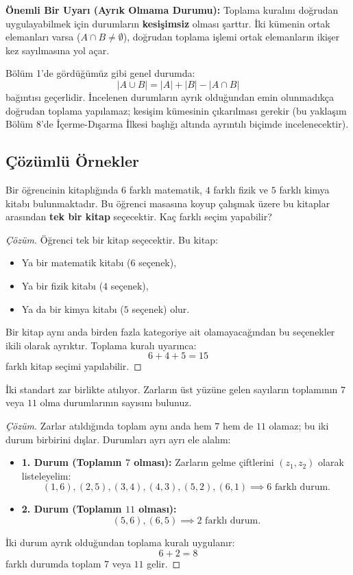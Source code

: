 \textbf{Önemli Bir Uyarı (Ayrık Olmama Durumu):} Toplama kuralını doğrudan uygulayabilmek için durumların \textbf{kesişimsiz} olması şarttır. İki kümenin ortak elemanları varsa ($A \cap B \neq \emptyset$), doğrudan toplama işlemi ortak elemanların ikişer kez sayılmasına yol açar. 

Bölüm 1'de gördüğümüz gibi genel durumda:
\[ |A \cup B| = |A| + |B| - |A \cap B| \]
bağıntısı geçerlidir. İncelenen durumların ayrık olduğundan emin olunmadıkça doğrudan toplama yapılamaz; kesişim kümesinin çıkarılması gerekir (bu yaklaşım Bölüm 8'de İçerme-Dışarma İlkesi başlığı altında ayrıntılı biçimde incelenecektir).

\subsection{Çözümlü Örnekler}

\begin{example}
Bir öğrencinin kitaplığında $6$ farklı matematik, $4$ farklı fizik ve $5$ farklı kimya kitabı bulunmaktadır. Bu öğrenci masasına koyup çalışmak üzere bu kitaplar arasından \textbf{tek bir kitap} seçecektir. Kaç farklı seçim yapabilir?
\end{example}
\begin{proof}[Çözüm]
Öğrenci tek bir kitap seçecektir. Bu kitap:
\begin{itemize}
  \item Ya bir matematik kitabı ($6$ seçenek),
  \item Ya bir fizik kitabı ($4$ seçenek),
  \item Ya da bir kimya kitabı ($5$ seçenek) olur.
\end{itemize}
Bir kitap aynı anda birden fazla kategoriye ait olamayacağından bu seçenekler ikili olarak ayrıktır. Toplama kuralı uyarınca:
\[ 6 + 4 + 5 = 15 \]
farklı kitap seçimi yapılabilir.
\end{proof}

\begin{example}
İki standart zar birlikte atılıyor. Zarların üst yüzüne gelen sayıların toplamının $7$ veya $11$ olma durumlarının sayısını bulunuz.
\end{example}
\begin{proof}[Çözüm]
Zarlar atıldığında toplam aynı anda hem $7$ hem de $11$ olamaz; bu iki durum birbirini dışlar. Durumları ayrı ayrı ele alalım:
\begin{itemize}
  \item \textbf{1. Durum (Toplamın $7$ olması):} Zarların gelme çiftlerini $(z_1, z_2)$ olarak listeleyelim:
  \[ (1, 6), (2, 5), (3, 4), (4, 3), (5, 2), (6, 1) \implies 6 \text{ farklı durum.} \]
  \item \textbf{2. Durum (Toplamın $11$ olması):}
  \[ (5, 6), (6, 5) \implies 2 \text{ farklı durum.} \]
\end{itemize}
İki durum ayrık olduğundan toplama kuralı uygulanır:
\[ 6 + 2 = 8 \]
farklı durumda toplam $7$ veya $11$ gelir.
\end{proof}


